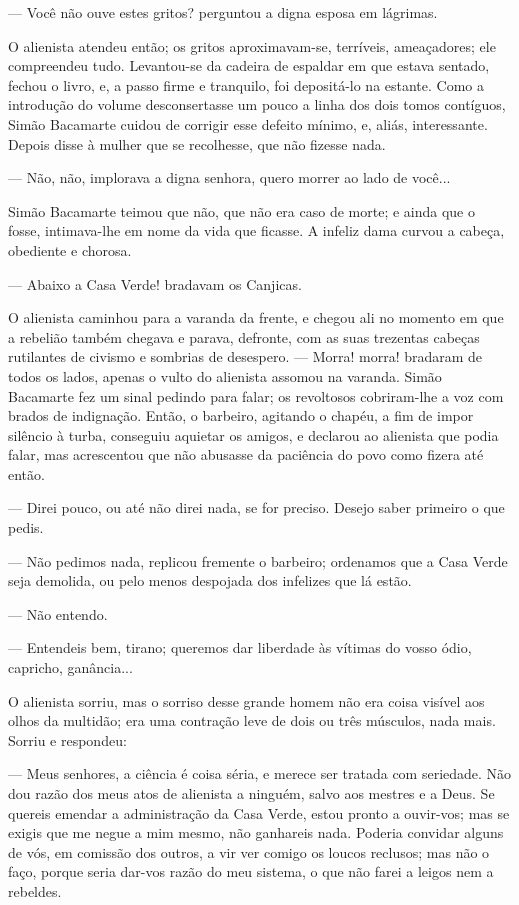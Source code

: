 --- Você não ouve estes gritos? perguntou a digna esposa em lágrimas.

O alienista atendeu então; os gritos aproximavam-se, terríveis,
ameaçadores; ele compreendeu tudo. Levantou-se da cadeira de espaldar em
que estava sentado, fechou o livro, e, a passo firme e tranquilo, foi
depositá-lo na estante. Como a introdução do volume desconsertasse um
pouco a linha dos dois tomos contíguos, Simão Bacamarte cuidou de
corrigir esse defeito mínimo, e, aliás, interessante. Depois disse à
mulher que se recolhesse, que não fizesse nada.

--- Não, não, implorava a digna senhora, quero morrer ao lado de você...

Simão Bacamarte teimou que não, que não era caso de morte; e ainda que o
fosse, intimava-lhe em nome da vida que ficasse. A infeliz dama curvou a
cabeça, obediente e chorosa.

--- Abaixo a Casa Verde! bradavam os Canjicas.

O alienista caminhou para a varanda da frente, e chegou ali no momento
em que a rebelião também chegava e parava, defronte, com as suas
trezentas cabeças rutilantes de civismo e sombrias de desespero. ---
Morra! morra! bradaram de todos os lados, apenas o vulto do alienista
assomou na varanda. Simão Bacamarte fez um sinal pedindo para falar; os
revoltosos cobriram-lhe a voz com brados de indignação. Então, o
barbeiro, agitando o chapéu, a fim de impor silêncio à turba, conseguiu
aquietar os amigos, e declarou ao alienista que podia falar, mas
acrescentou que não abusasse da paciência do povo como fizera até então.

--- Direi pouco, ou até não direi nada, se for preciso. Desejo saber
primeiro o que pedis.

--- Não pedimos nada, replicou fremente o barbeiro; ordenamos que a Casa
Verde seja demolida, ou pelo menos despojada dos infelizes que lá estão.

--- Não entendo.

--- Entendeis bem, tirano; queremos dar liberdade às vítimas do vosso
ódio, capricho, ganância...

O alienista sorriu, mas o sorriso desse grande homem não era coisa
visível aos olhos da multidão; era uma contração leve de dois ou três
músculos, nada mais. Sorriu e respondeu:

--- Meus senhores, a ciência é coisa séria, e merece ser tratada com
seriedade. Não dou razão dos meus atos de alienista a ninguém, salvo aos
mestres e a Deus. Se quereis emendar a administração da Casa Verde,
estou pronto a ouvir-vos; mas se exigis que me negue a mim mesmo, não
ganhareis nada. Poderia convidar alguns de vós, em comissão dos outros,
a vir ver comigo os loucos reclusos; mas não o faço, porque seria
dar-vos razão do meu sistema, o que não farei a leigos nem a rebeldes.

